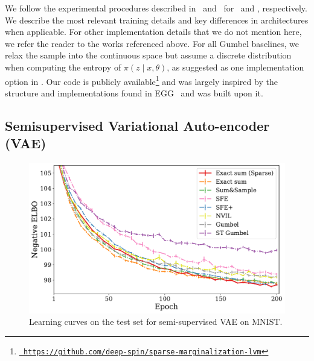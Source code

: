 We follow the experimental procedures described
in~\citep{RB19} and~\citep{Lazaridou2017} for~ and
, respectively. We describe the most relevant
training details and key differences in architectures when
applicable. For other implementation details that we do not mention
here, we refer the reader to the works referenced above. For all
Gumbel baselines, we relax the sample into the continuous space but
assume a discrete distribution when computing the entropy of $\pi(z
    \mid x, \theta)$, as suggested as one implementation option in
\citet{Concrete}. Our code is publicly available\footnote{
    \href{https://github.com/deep-spin/sparse-marginalization-lvm}{\tt
        https://github.com/deep-spin/sparse-marginalization-lvm}} and was
largely inspired by the structure and implementations found in
EGG~\citep{Kharitonov2019} and was built upon it.

\subsection{Semisupervised Variational Auto-encoder (VAE)}\label{sec:gen}

\begin{figure}[htbp]
    \centering
    \includegraphics[width=.9\textwidth]{Figures/ss_mnist_elbo_path.pdf}
    \caption{\label{fig:ssvaeelbo}Learning curves on the test set for semi-supervised VAE on MNIST.}
\end{figure}


